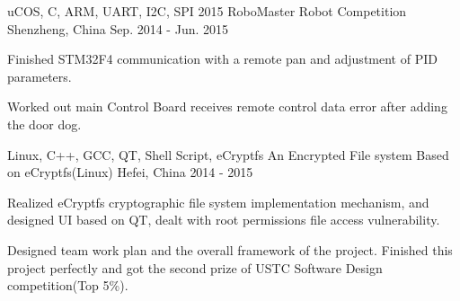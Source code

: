 \begin{cventries}

  \cventry
    {uCOS, C, ARM, UART, I2C, SPI} %
    {2015 RoboMaster Robot Competition} %
    {Shenzheng, China} %
    {Sep. 2014 - Jun. 2015}%
    {
      \begin{cvitems} %
        \item  {Finished STM32F4 communication with a remote pan and adjustment of PID parameters.}
        \item {Worked out main Control Board receives remote control data error after adding the door dog.}
      \end{cvitems}
    }

  \cventry
    {Linux, C++, GCC, QT, Shell Script, eCryptfs} %
    {An Encrypted File system Based on eCryptfs(Linux)} %
    {Hefei, China} %
    {2014 - 2015}%
    {
      \begin{cvitems} %
        \item  {Realized eCryptfs cryptographic file system implementation mechanism, and designed UI based on QT, dealt with root permissions file access vulnerability.}
        \item  {Designed team work plan and the overall framework of the project. Finished this project perfectly and got the second prize of USTC Software Design competition(Top 5\%).}
      \end{cvitems}
    }


\end{cventries}
